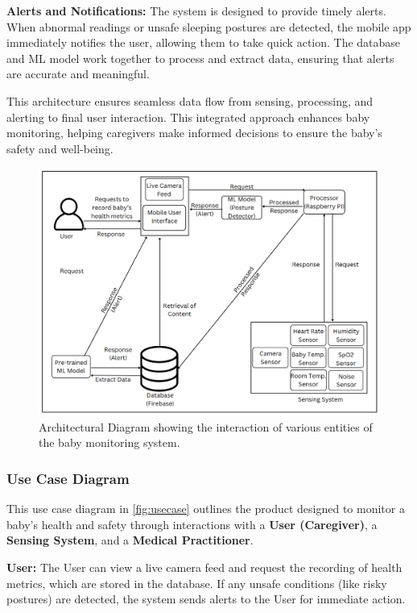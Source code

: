 \documentclass[conference]{IEEEtran}
\begin{document}
\textbf{Alerts and Notifications:} The system is designed to provide timely alerts. When abnormal readings or unsafe sleeping postures are detected, the mobile app immediately notifies the user, allowing them to take quick action. The database and ML model work together to process and extract data, ensuring that alerts are accurate and meaningful.

 This architecture ensures seamless data flow from sensing, processing, and alerting to final user interaction. This integrated approach enhances baby monitoring, helping caregivers make informed decisions to ensure the baby's safety and well-being.


\begin{figure}[hbtp]
  \centering
  \includegraphics[scale=0.3]{./pic/finarch.png}
  \caption{Architectural Diagram showing the interaction of various entities of the baby monitoring system.}
  \label{fig:architecture}
\end{figure}
\subsubsection{Use Case Diagram}

This use case diagram in \ref{fig:usecase} outlines the product designed to monitor a baby’s health and safety through interactions with a \textbf{User (Caregiver)}, a \textbf{Sensing System}, and a \textbf{Medical Practitioner}.

\textbf{User:} The User can view a live camera feed and request the recording of health metrics, which are stored in the database. If any unsafe conditions (like risky postures) are detected, the system sends alerts to the User for immediate action.
    
\end{document}
